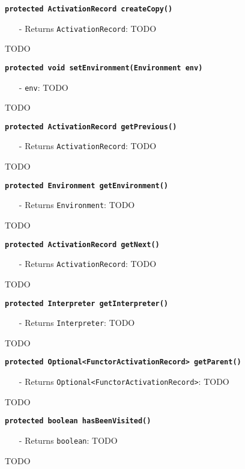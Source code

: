 \documentclass[parskip=full,11pt,twoside]{scrartcl}
\begin{document}
\textbf{\texttt{protected ActivationRecord createCopy()}}
\begin{itemize}[noitemsep]
	\item[-] Returns \texttt{ActivationRecord}: TODO
\end{itemize}
TODO

\textbf{\texttt{protected void setEnvironment(Environment env)}}
\begin{itemize}[noitemsep]
	\item[-] \texttt{env}: TODO
\end{itemize}
TODO

\textbf{\texttt{protected ActivationRecord getPrevious()}}
\begin{itemize}[noitemsep]
	\item[-] Returns \texttt{ActivationRecord}: TODO
\end{itemize}
TODO

\textbf{\texttt{protected Environment getEnvironment()}}
\begin{itemize}[noitemsep]
	\item[-] Returns \texttt{Environment}: TODO
\end{itemize}
TODO

\textbf{\texttt{protected ActivationRecord getNext()}}
\begin{itemize}[noitemsep]
	\item[-] Returns \texttt{ActivationRecord}: TODO
\end{itemize}
TODO

\textbf{\texttt{protected Interpreter getInterpreter()}}
\begin{itemize}[noitemsep]
	\item[-] Returns \texttt{Interpreter}: TODO
\end{itemize}
TODO

\textbf{\texttt{protected Optional<FunctorActivationRecord> getParent()}}
\begin{itemize}[noitemsep]
	\item[-] Returns \texttt{Optional<FunctorActivationRecord>}: TODO
\end{itemize}
TODO

\textbf{\texttt{protected boolean hasBeenVisited()}}
\begin{itemize}[noitemsep]
	\item[-] Returns \texttt{boolean}: TODO
\end{itemize}
TODO
\end{document}
